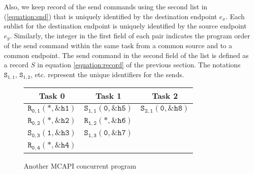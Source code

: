 Also, we keep record of the send commands using the second list in (\ref{equation:snd}) that is uniquely identified by the destination endpoint $\mathit{e}_x$. Each sublist for the destination endpoint is uniquely identified by the source endpoint $\mathit{e}_y$. Similarly, the integer in the first field of each pair indicates the program order of the send command within the same task from a common source and to a common endpoint. The send command in the second field of the list is defined as a record $S$ in equation \ref{equation:record} of the previous section. The notations $\mathtt{S_{1,1}}$, $\mathtt{S_{1,2}}$, etc. represent the unique identifiers for the sends.

\begin{figure}
\begin{center}
\setlength{\tabcolsep}{2pt}
\begin{tabular}[c]{c|c|c}
Task 0 & Task 1 & Task 2 \\
\hline
$\mathtt{R_{0,1}(*,\&h1)}$ & $\mathtt{S_{1,1}(0,\&h5)}$ & $\mathtt{S_{2,1}(0,\&h8)}$\\
$\mathtt{R_{0,2}(*,\&h2)}$ & $\mathtt{R_{1,2}(*,\&h6)}$ & \\
$\mathtt{S_{0,3}(1,\&h3)}$ & $\mathtt{S_{1,3}(0,\&h7)}$ & \\
$\mathtt{R_{0,4}(*,\&h4)}$ & & \\


\end{tabular}
\end{center}
\caption{Another MCAPI concurrent program}
\label{fig:mcapi1}
\end{figure}

